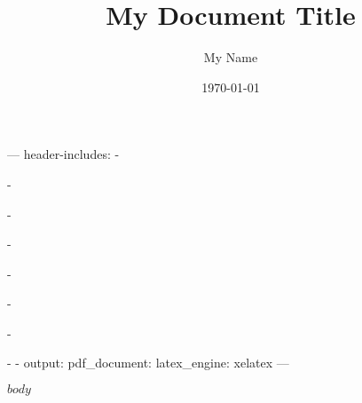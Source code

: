 ---
header-includes:
  - \usepackage{geometry}
  - \usepackage{titlesec}
  - \usepackage{titling}
  - \usepackage{fancyhdr}
  - \usepackage{color}
  - \usepackage{hyperref}
  - \usepackage{fontspec}
  - \setmainfont{Times New Roman}
  - \geometry{margin=1in}
output:
  pdf_document:
    latex_engine: xelatex
---

\pagestyle{fancy}
\fancyhf{}
\fancyhead[L]{\textcolor{gray}{\small\thetitle}}
\fancyfoot[C]{\thepage}

\renewcommand{\maketitle}{
  \begin{center}
    {\LARGE\thetitle} \vspace{5pt} \\
    \theauthor \\ \vspace{5pt}
    \thedate
  \end{center}
  \vspace{10pt}
}

\title{\Huge My Document Title}
\author{My Name}
\date{\today}



$body$


